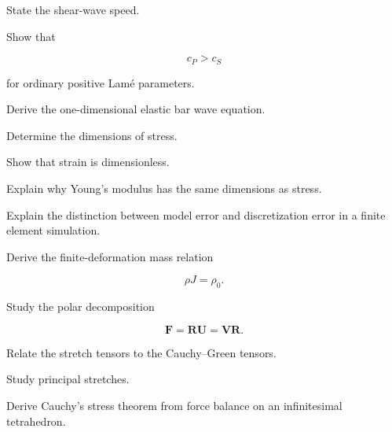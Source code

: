 \begin{exercise}[2]
State the shear-wave speed.
\end{exercise}

\begin{exercise}[3]
Show that

\[
c_P>c_S
\]

for ordinary positive Lamé parameters.
\end{exercise}

\begin{exercise}[3]
Derive the one-dimensional elastic bar wave equation.
\end{exercise}

\begin{exercise}[2]
Determine the dimensions of stress.
\end{exercise}

\begin{exercise}[2]
Show that strain is dimensionless.
\end{exercise}

\begin{exercise}[3]
Explain why Young's modulus has the same dimensions as stress.
\end{exercise}

\begin{exercise}[3]
Explain the distinction between model error and discretization error in a
finite element simulation.
\end{exercise}

\begin{exercise}[4]
Derive the finite-deformation mass relation

\[
\rho J=\rho_0.
\]
\end{exercise}

\begin{exercise}[4]
Study the polar decomposition

\[
\mathbf{F}
=
\mathbf{R}\mathbf{U}
=
\mathbf{V}\mathbf{R}.
\]
\end{exercise}

\begin{exercise}[4]
Relate the stretch tensors to the Cauchy--Green tensors.
\end{exercise}

\begin{exercise}[4]
Study principal stretches.
\end{exercise}

\begin{exercise}[4]
Derive Cauchy's stress theorem from force balance on an infinitesimal
tetrahedron.
\end{exercise}


